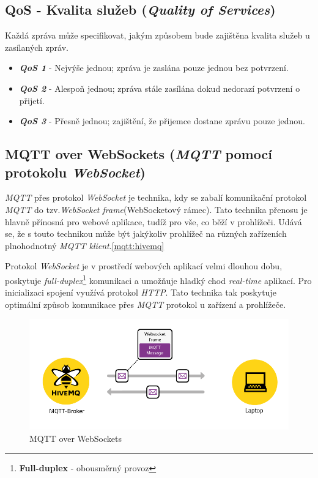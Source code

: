 \newpage
\subsection*{QoS - Kvalita služeb (\emph{Quality of Services})}
Každá zpráva může specifikovat, jakým způsobem bude zajištěna kvalita služeb u zasílaných zpráv.~\cite{wiki:mqtt_broker}
\begin{itemize}
  \item \textbf{\emph{QoS 1}} - Nejvýše jednou; zpráva je zaslána pouze jednou bez potvrzení.
  \item \textbf{\emph{QoS 2}} - Alespoň jednou; zpráva stále zasílána dokud nedorazí potvrzení o přijetí.
  \item \textbf{\emph{QoS 3}} - Přesně jednou; zajištění, že přijemce dostane zprávu pouze jednou.
\end{itemize}

\subsection*{MQTT over WebSockets (\emph{MQTT} pomocí protokolu \emph{WebSocket})}
\label{mqtt:websockets}
\emph{MQTT} přes protokol \emph{WebSocket} je technika, kdy se zabalí komunikační protokol \emph{MQTT} do tzv.\emph{WebSocket frame}(WebSocketový rámec).
Tato technika přenosu je hlavně přínosná pro webové aplikace, tudíž pro vše, co běží v prohlížeči.
Udává se, že s touto technikou může být jakýkoliv prohlížeč na různých zařízeních plnohodnotný \emph{MQTT klient}.\ref{mqtt:hivemq}

Protokol \emph{WebSocket} je v prostředí webových aplikací velmi dlouhou dobu, poskytuje \emph{full-duplex}\footnote{\textbf{Full-duplex} - obousměrný provoz} komunikaci a umožňuje hladký chod \emph{real-time} aplikací.
Pro inicializaci spojení využívá protokol \emph{HTTP}.
Tato technika tak poskytuje optimální způsob komunikace přes \emph{MQTT} protokol u zařízení a prohlížeče.

\begin{figure}[ht]
  \centering
  \includegraphics[width=1 \linewidth]{obrazky-figures/mqtt_websocket.png}
  \caption{MQTT over WebSockets}
  \label{figure:mqtt_websockets}
\end{figure}

